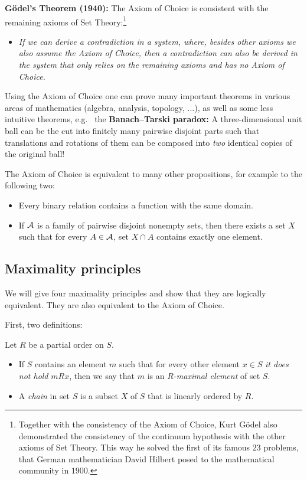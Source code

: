 \documentclass[11pt,paper=b5,footinclude,headinclude]{scrbook} %
\theoremstyle{remark}
\theoremstyle{definition} %
\theoremstyle{theorem} %
\begin{document}
\textbf{ G\"odel's Theorem (1940):} The Axiom of Choice is consistent with the remaining axioms of Set Theory:\footnote{Together with the consistency of the Axiom of Choice, Kurt G\"odel also demonstrated the consistency of the continuum hypothesis with the other axioms of Set Theory. This way he solved the first of its famous $23$ problems, that
German mathematician David Hilbert posed to the mathematical community in $1900$.}
\begin{itemize}
  \item \emph{ If we can derive a contradiction in a system, where, besides other axioms we also assume the Axiom of Choice, then a contradiction can also be derived in the system that only relies on the remaining axioms and has no Axiom of Choice.}
\end{itemize}

\bigskip

Using the Axiom of Choice one can prove many important theorems in various areas of mathematics (algebra, analysis, topology, $\ldots $), as well as some less intuitive theorems, e.g.~ the \textbf{ Banach--Tarski paradox:} A three-dimensional unit ball can be the cut into finitely many pairwise disjoint parts such that
translations and rotations of them can be composed into {\em two} identical copies of the original ball!

\bigskip
The Axiom of Choice is equivalent to many other propositions, for example to the following two:
\begin{itemize}
  \item Every binary relation contains a function with the same domain.
  \item If  ${\cal A}$ is a family of pairwise disjoint nonempty sets, then there exists a set $X$ such that for every $A\in {\cal A}$, set $X\cap A$ contains exactly one element.
\end{itemize}

\subsection{Maximality principles}

We will give four maximality principles and show that they are logically equivalent.
They are also equivalent to the Axiom of Choice.

\bigskip

First, two definitions:


Let $R$ be a partial order on $S$.
\begin{itemize}
  \item If $S$ contains an element $m$ such that for every other element $x\in S$ {\em it does not hold} $mRx$,
  then we say that $m$ is an {\em $R$-maximal element} of set $S$.

  \item A {\em chain} in set $S$ is a subset $X$ of $S$ that is linearly ordered by $R$.
\end{itemize}
\end{document}

